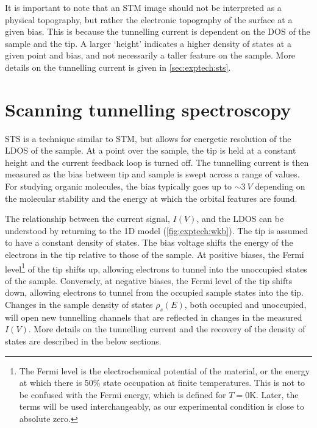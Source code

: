 \begin{figure} [h]
    \centering
    \caption{}
    \label{fig:exptech:stmexample}
\end{figure}

It is important to note that an \ac{STM} image should not be interpreted as a physical topography, but rather the electronic topography of the surface at a given bias. This is because the tunnelling current is dependent on the \ac{DOS} of the sample and the tip. A larger `height' indicates a higher density of states at a given point and bias, and not necessarily a taller feature on the sample. More details on the tunnelling current is given in \autoref{sec:exptech:sts}.




\section{Scanning tunnelling spectroscopy}
\label{sec:exptech:sts}

\Acf{STS} is a technique similar to \ac{STM}, but allows for energetic resolution of the \ac{LDOS} of the sample. At a point over the sample, the tip is held at a constant height and the current feedback loop is turned off. The tunnelling current is then measured as the bias between tip and sample is swept across a range of values. For studying organic molecules, the bias typically goes up to $\sim \SI{3}{V}$ depending on the molecular stability and the energy at which the orbital features are found.

The relationship between the current signal, $I(V)$, and the \ac{LDOS} can be understood by returning to the \ac{1D} model (\autoref{fig:exptech:wkb}). The tip is assumed to have a constant density of states. The bias voltage shifts the energy of the electrons in the tip relative to those of the sample. At positive biases, the Fermi level\footnote{The Fermi level is the electrochemical potential of the material, or the energy at which there is 50\% state occupation at finite temperatures. This is not to be confused with the Fermi energy, which is defined for $T=0$K. Later, the terms will be used interchangeably, as our experimental condition is close to absolute zero.} of the tip shifts up, allowing electrons to tunnel into the unoccupied states of the sample. Conversely, at negative biases, the Fermi level of the tip shifts down, allowing electrons to tunnel from the occupied sample states into the tip. Changes in the sample density of states $\rho_s(E)$, both occupied and unoccupied, will open new tunnelling channels that are reflected in changes in the measured $I(V)$. More details on the tunnelling current and the recovery of the density of states are described in the below sections.

